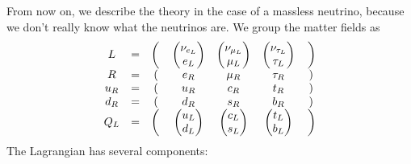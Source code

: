\documentclass[a4paper]{article}
\begin{document}
From now on, we describe the theory in the case of a massless neutrino, because we don't really know what the neutrinos are. We group the matter fields as
\[
  \begin{array}{ccccccc}
    L &=& \left(\vphantom{\begin{pmatrix}
      \nu_{e_L}\\
      e_L
    \end{pmatrix}}\right.&\begin{pmatrix}
      \nu_{e_L}\\
      e_L
    \end{pmatrix} &
    \begin{pmatrix}
      \nu_{\mu_L}\\
      \mu_L
    \end{pmatrix} &
    \begin{pmatrix}
      \nu_{\tau_L}\\
      \tau_L
    \end{pmatrix}&\left.\vphantom{\begin{pmatrix}
      \nu_{e_L}\\
      e_L
    \end{pmatrix}}\right)\\
    R &= &(& e_R & \mu_R & \tau_R &)\\
    u_R &=&(& u_R & c_R & t_R&)\\
    d_R &=&(& d_R & s_R & b_R&)\\
    Q_L &= &\left(\vphantom{\begin{pmatrix}
      \nu_{e_L}\\
      e_L
    \end{pmatrix}}\right.&
    \begin{pmatrix}
      u_L\\d_L
    \end{pmatrix} &
    \begin{pmatrix}
      c_L\\ s_L
    \end{pmatrix} &
    \begin{pmatrix}
      t_L\\ b_L
    \end{pmatrix}&\left.\vphantom{\begin{pmatrix}
      \nu_{e_L}\\
      e_L
    \end{pmatrix}}\right)
  \end{array}
\]
The Lagrangian has several components:
\end{document}
